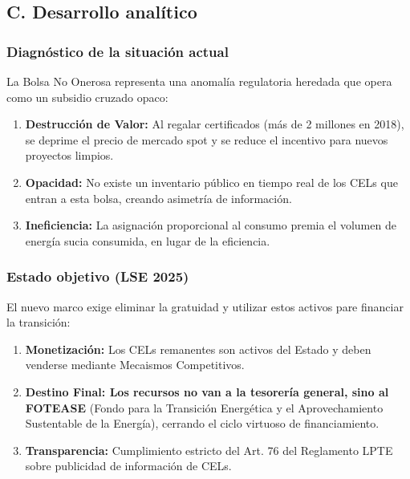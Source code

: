 \documentclass{cel}
\begin{document}
\subsection{C. Desarrollo analítico}
\nopagebreak

\subsubsection{Diagnóstico de la situación actual}
\nopagebreak

La \textquotedbl{}Bolsa No Onerosa\textquotedbl{} representa una anomalía regulatoria heredada que opera como un subsidio cruzado opaco:


\begin{enumerate}
\item \textbf{Destrucción de Valor:} Al regalar certificados (más de 2 millones en 2018), se deprime el precio de mercado spot y se reduce el incentivo para nuevos proyectos limpios.
\item \textbf{Opacidad:} No existe un inventario público en tiempo real de los CELs que entran a esta bolsa, creando asimetría de información.
\item \textbf{Ineficiencia:} La asignación proporcional al consumo premia el volumen de energía sucia consumida, en lugar de la eficiencia.

\end{enumerate}
\subsubsection{Estado objetivo (LSE 2025)}
\nopagebreak

El nuevo marco exige eliminar la gratuidad y utilizar estos activos pare financiar la transición:


\begin{enumerate}
\item \textbf{Monetización:} Los CELs remanentes son activos del Estado y deben venderse mediante Mecaismos Competitivos.
\item \textbf{Destino Final: \textbf{ Los recursos no van a la tesorería general, sino al }FOTEASE} (Fondo para la Transición Energética y el Aprovechamiento Sustentable de la Energía), cerrando el ciclo virtuoso de financiamiento.
\item \textbf{Transparencia:} Cumplimiento estricto del Art. 76 del Reglamento LPTE sobre publicidad de información de CELs.

\end{enumerate}
\vspace{0.4cm}
\end{document}
